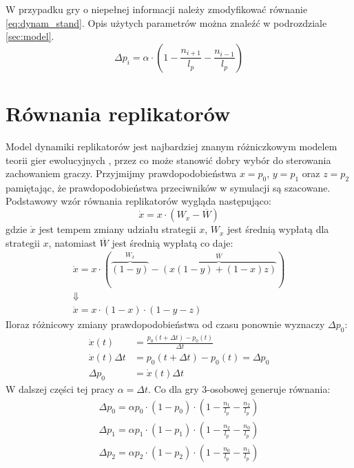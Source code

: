 W przypadku gry o niepełnej informacji należy zmodyfikować równanie \ref{eq:dynam_stand}. Opis użytych parametrów można znaleźć w podrozdziale \ref{sec:model}.
\begin{equation} \label{eq:stand}
\Delta p_i = \alpha \cdot (1 - \frac{n_{i+1}}{l_p} - \frac{n_{i-1}}{l_p})
\end{equation}


\section{Równania replikatorów}
\label{sec:r_repli}
Model dynamiki replikatorów jest najbardziej znanym różniczkowym modelem teorii gier ewolucyjnych \cite{Now06}\cite{Hof98}, przez co może stanowić dobry wybór do sterowania zachowaniem graczy. Przyjmijmy prawdopodobieństwa $x=p_0$, $y=p_1$ oraz $z=p_2$ pamiętając, że prawdopodobieństwa przeciwników w symulacji są szacowane. Podstawowy wzór równania replikatorów wygląda następująco:
\begin{equation}
\dot{x} = x \cdot ( W_x - \overline{W})
\end{equation}
gdzie $\dot{x}$ jest tempem zmiany udziału strategii $x$, $W_x$ jest średnią wypłatą dla strategii $x$, natomiast $\overline{W}$ jest średnią wypłatą co daje:
\begin{gather*}
\dot{x} = x \cdot ( \overbrace{(1-y)}^{W_x} - \overbrace{(x(1-y) + (1-x)z)}^{\overline{W}}) \\
\Downarrow \\
\dot{x} = x \cdot (1-x) \cdot (1-y-z)
\end{gather*}
Iloraz różnicowy zmiany prawdopodobieństwa od czasu ponownie wyznaczy $\Delta p_0$:
\begin{align*}
\dot{x}(t) &= \frac{p_0(t+\Delta t)-p_0(t)}{\Delta t} \\
\dot{x}(t) \Delta t &= p_0(t+\Delta t)-p_0(t) = \Delta p_0 \\
\Delta p_0 &= \dot{x}(t) \Delta t
\end{align*} 
W dalszej części tej pracy $\alpha=\Delta t$. Co dla gry 3-osobowej generuje równania:
\begin{align} \label{eq:repli}
\Delta p_0 = \alpha p_0 \cdot (1 - p_0) \cdot (1 - \frac{n_1}{l_p} - \frac{n_2}{l_p}) \nonumber \\
\Delta p_1 = \alpha p_1 \cdot (1 - p_1) \cdot (1 - \frac{n_2}{l_p} - \frac{n_0}{l_p}) \\
\Delta p_2 = \alpha p_2 \cdot (1 - p_2) \cdot (1 - \frac{n_0}{l_p} - \frac{n_1}{l_p}) \nonumber
\end{align} 

